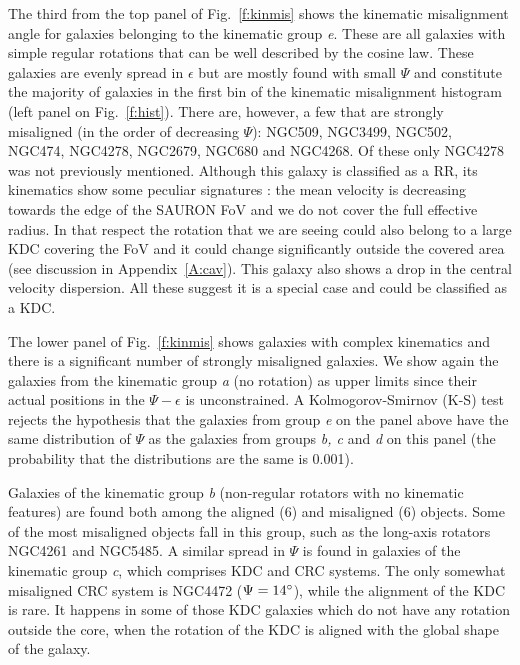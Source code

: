 \documentclass[usenatbib,usegraphicx]{mn2e}
\begin{document}
The third from the top panel of Fig.~\ref{f:kinmis} shows the kinematic misalignment angle for galaxies belonging to the kinematic group {\it e}. These are all galaxies with simple regular rotations that can be well described by the cosine law. These galaxies are evenly spread in $\epsilon$ but are mostly found with small $\Psi$ and constitute the majority of galaxies in the first bin of the kinematic misalignment histogram (left panel on Fig.~\ref{f:hist}). There are, however, a few that are strongly misaligned (in the order of decreasing $\Psi$): NGC509, NGC3499, NGC502, NGC474, NGC4278, NGC2679, NGC680 and NGC4268. Of these only NGC4278 was not previously mentioned. Although this galaxy is classified as a RR, its kinematics show some peculiar signatures \citep{1979ApJ...229..472S,1988ApJS...68..409D,1993ApJ...407..525V,2004MNRAS.352..721E}: the mean velocity is decreasing towards the edge of the SAURON FoV and we do not cover the full effective radius. In that respect the rotation that we are seeing could also belong to a large KDC covering the FoV and it could change significantly outside the covered area (see discussion in Appendix~\ref{A:cav}). This galaxy also shows a drop in the central velocity dispersion. All these suggest it is a special case and could be classified as a KDC.

The lower panel of Fig.~\ref{f:kinmis} shows galaxies with complex kinematics and there is a significant number of strongly misaligned galaxies. We show again the galaxies from the kinematic group {\it a} (no rotation) as upper limits since their actual positions in the $\Psi - \epsilon$ is unconstrained. A Kolmogorov-Smirnov (K-S) test \citep{1992nrfa.book.....P} rejects the hypothesis that the galaxies from group {\it e} on the panel above have the same distribution of $\Psi$ as the galaxies from groups {\it b, c} and {\it d} on this panel (the probability that the distributions are the same is 0.001).

Galaxies of the kinematic group {\it b} (non-regular rotators with no kinematic features) are found both among the aligned (6) and misaligned (6) objects. Some of the most misaligned objects fall in this group, such as the long-axis rotators NGC4261 and NGC5485. A similar spread in $\Psi$ is found in galaxies of the kinematic group {\it c}, which comprises KDC and CRC systems. The only somewhat misaligned CRC system is NGC4472 ($\Psi=14\hbox{$^\circ$}$), while the alignment of the KDC is rare. It  happens in some of those KDC galaxies which do not have any rotation outside the core, when the rotation of the KDC is aligned with the global shape of the galaxy.
\end{document}
